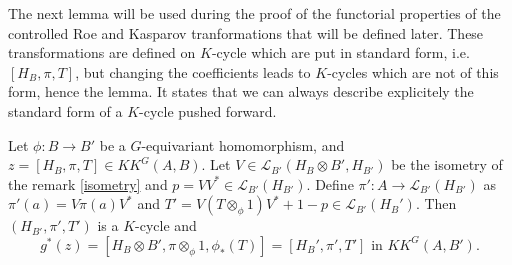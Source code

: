 The next lemma will be used during the proof of the functorial properties of the controlled Roe and Kasparov tranformations that will be defined later. These transformations are defined on $K$-cycle which are put in standard form, i.e. $[H_B,\pi,T]$, but changing the coefficients leads to $K$-cycles which are not of this form, hence the lemma. It states that we can always describe explicitely the standard form of a $K$-cycle pushed forward.

\begin{lem}\label{isometryKK}
Let $\phi : B\rightarrow B'$ be a $G$-equivariant homomorphism, and $z=[H_B,\pi, T]\in KK^G(A,B)$. Let $V\in\mathcal L_{B'}(H_B\otimes B', H_{B'})$ be the isometry of the remark \ref{isometry} and $p = VV^*\in\mathcal L_{B'}(H_{B'})$. Define $\pi' : A\rightarrow \mathcal L_{B'}(H_{B'})$ as $\pi'(a) = V\pi(a)V^*$ and $T'= V(T\otimes_\phi 1)V^* + 1-p \in \mathcal L_{B'}(H_B')$. Then $(H_{B'},\pi',T')$ is a $K$-cycle and 
\[g^*(z) = [H_B\otimes B',\pi\otimes_\phi 1,\phi_*(T)]=[H_B', \pi', T']\text{ in } KK^G(A,B').\]
\end{lem} 

